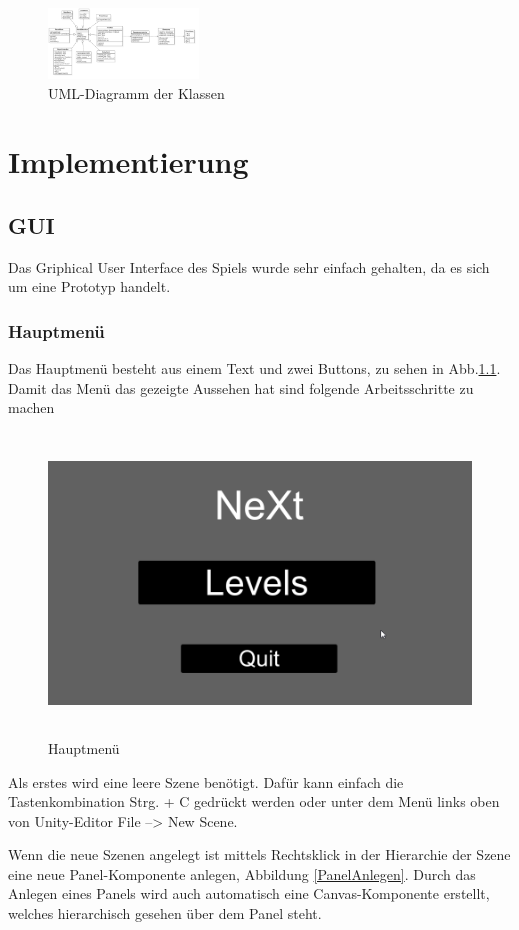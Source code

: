 \begin{figure}[H]
	\centering
	\includegraphics[width=4cm]{images/UML.png}
	\caption{UML-Diagramm der Klassen}		
\end{figure}

\chapter{Implementierung}
\section{GUI}
Das Griphical User Interface des Spiels wurde sehr einfach gehalten, da es sich um eine Prototyp handelt.
\subsection{Hauptmenü}
Das Hauptmenü besteht aus einem Text und zwei Buttons, zu sehen in Abb.\ref{Mainmenu}. Damit das Menü das gezeigte Aussehen hat sind folgende Arbeitsschritte zu machen

\begin{figure}[H]
	\centering
	\includegraphics[height=8cm]{images/Mainmenu.png}
	\caption{Hauptmenü}
	\label{Mainmenu}
\end{figure}
Als erstes wird eine leere Szene benötigt. Dafür kann einfach die Tastenkombination Strg. + C gedrückt werden oder unter dem Menü links oben von Unity-Editor File --> New Scene.

Wenn die neue Szenen angelegt ist mittels Rechtsklick in der Hierarchie der Szene eine neue Panel-Komponente anlegen, Abbildung \ref{PanelAnlegen}. Durch das Anlegen eines Panels wird auch automatisch eine Canvas-Komponente erstellt, welches hierarchisch gesehen über dem Panel steht.


